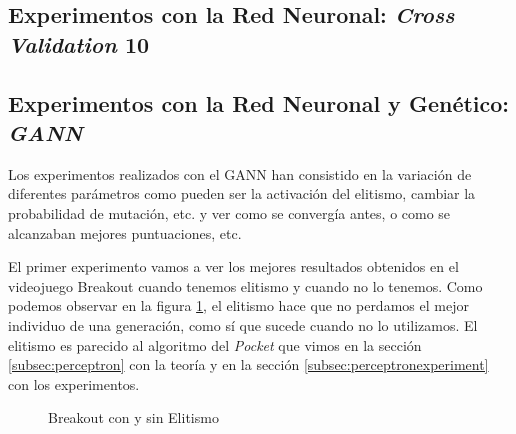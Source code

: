 \newpage
\subsection{Experimentos con la Red Neuronal: \textit{Cross Validation} 10}
\label{subsubsec:nnexperiments:CV10}

\newpage
\subsection{Experimentos con la Red Neuronal y Genético: \textit{GANN}}
\label{subsubsec:nnexperiments:GANN}

Los experimentos realizados con el GANN han consistido en la variación de diferentes parámetros como pueden ser la activación del elitismo, cambiar la probabilidad de mutación, etc. y ver como se convergía antes, o como se alcanzaban mejores puntuaciones, etc.

El primer experimento vamos a ver los mejores resultados obtenidos en el videojuego Breakout cuando tenemos elitismo y cuando no lo tenemos. Como podemos observar en la figura \ref{fig:breakoutWithAndWithoutElitism}, el elitismo hace que no perdamos el mejor individuo de una generación, como sí que sucede cuando no lo utilizamos. El elitismo es parecido al algoritmo del \textit{Pocket} que vimos en la sección \ref{subsec:perceptron} con la teoría y en la sección \ref{subsec:perceptronexperiment} con los experimentos.

\begin{figure}[!h]
    \centering
    
    
    \caption{Breakout con y sin Elitismo}
    \label{fig:breakoutWithAndWithoutElitism}
\end{figure}

